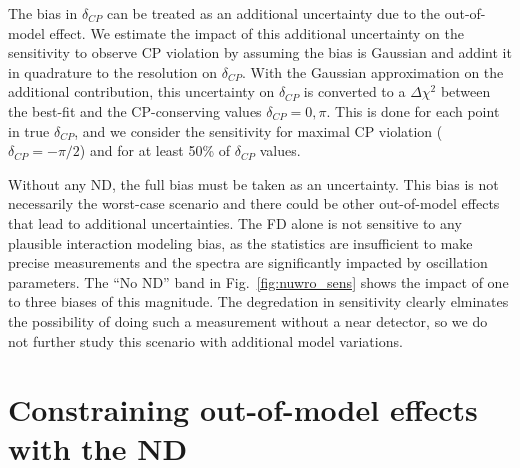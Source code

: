 \documentclass[11pt]{article}
\begin{document}
The bias in $\delta_{CP}$ can be treated as an additional uncertainty due to the out-of-model effect. We estimate the impact of this additional uncertainty on the sensitivity to observe CP violation by assuming the bias is Gaussian and addint it in quadrature to the resolution on $\delta_{CP}$. With the Gaussian approximation on the additional contribution, this uncertainty on $\delta_{CP}$ is converted to a $\Delta \chi^{2}$ between the best-fit and the CP-conserving values $\delta_{CP} = 0,\pi$. This is done for each point in true $\delta_{CP}$, and we consider the sensitivity for maximal CP violation ($\delta_{CP} = -\pi/2$) and for at least 50\% of $\delta_{CP}$ values.

Without any ND, the full bias must be taken as an uncertainty. This bias is not necessarily the worst-case scenario and there could be other out-of-model effects that lead to additional uncertainties. The FD alone is not sensitive to any plausible interaction modeling bias, as the statistics are insufficient to make precise measurements and the spectra are significantly impacted by oscillation parameters. The ``No ND'' band in Fig.~\ref{fig:nuwro_sens} shows the impact of one to three biases of this magnitude. The degredation in sensitivity clearly elminates the possibility of doing such a measurement without a near detector, so we do not further study this scenario with additional model variations.

\section{Constraining out-of-model effects with the ND}
\label{sec:ndconstraint}
\end{document}
